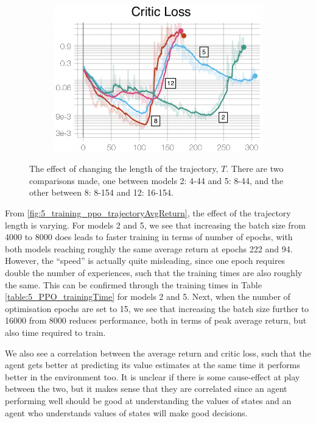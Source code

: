 \begin{figure}[hbt]
\begin{subfigure}[b]{0.32\textwidth}
         \caption{}
         \label{fig:5_training_ppo_trajectoryActorL}
     \end{subfigure}
     \hfill
     \begin{subfigure}[b]{0.32\textwidth}
         \centering
         \includegraphics[width=\textwidth]{figures/5_/Training/ppo_trajectory_criticLoss.png}
         \caption{}
         \label{fig:5_training_ppo_trajectoryCriticL}
     \end{subfigure}
    \captionsetup{justification=centering}
    \caption{The effect of changing the length of the trajectory, $T$. There are two comparisons made, one between models 2: 4-44 and 5: 8-44, and the other between 8: 8-154 and 12: 16-154.}
     \label{fig:5_training_ppo_trajectory}
\end{figure}
From \cref{fig:5_training_ppo_trajectoryAvgReturn}, the effect of the trajectory length is varying. For models 2 and 5, we see that increasing the batch size from 4000 to 8000 does leads to faster training in terms of number of epochs, with both models reaching roughly the same average return at epochs 222 and 94. However, the ``speed'' is actually quite misleading, since one epoch requires double the number of experiences, such that the training times are also roughly the same. This can be confirmed through the training times in Table \ref{table:5_PPO_trainingTime} for models 2 and 5. Next, when the number of optimisation epochs are set to 15, we see that increasing the batch size further to 16000 from 8000 reduces performance, both in terms of peak average return, but also time required to train. 

We also see a correlation between the average return and critic loss, such that the agent gets better at predicting its value estimates at the same time it performs better in the environment too. It is unclear if there is some cause-effect at play between the two, but it makes sense that they are correlated since an agent performing well should be good at understanding the values of states and an agent who understands values of states will make good decisions.

